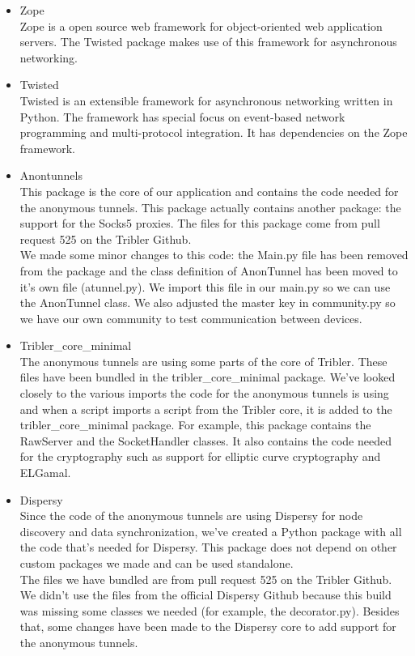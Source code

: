 \documentclass{article}
\begin{document}
\begin{itemize}
		\item Zope\\
		Zope is a open source web framework for object-oriented web application servers. The Twisted package makes use of this framework for asynchronous networking.
	
		\item Twisted\\
		Twisted is an extensible framework for asynchronous networking written in Python. The framework has special focus on event-based network programming and multi-protocol integration. It has dependencies on the Zope framework.
	
		\item Anontunnels\\
		This package is the core of our application and contains the code needed for the anonymous tunnels. This package actually contains another package: the support for the Socks5 proxies. The files for this package come from pull request 525 on the Tribler Github.\\
		
		We made some minor changes to this code: the Main.py file has been removed from the package and the class definition of AnonTunnel has been moved to it’s own file (atunnel.py). We import this file in our main.py so we can use the AnonTunnel class. We also adjusted the master key in community.py so we have our own community to test communication between devices.
		
		\item Tribler\_core\_minimal\\
		The anonymous tunnels are using some parts of the core of Tribler. These files have been bundled in the tribler\_core\_minimal package. We’ve looked closely to the various imports the code for the anonymous tunnels is using and when a script imports a script from the Tribler core, it is added to the tribler\_core\_minimal package. For example, this package contains the RawServer and the SocketHandler classes. It also contains the code needed for the cryptography such as support for elliptic curve cryptography and ELGamal.
		
		\item Dispersy\\
		Since the code of the anonymous tunnels are using Dispersy for node discovery and data synchronization, we’ve created a Python package with all the code that’s needed for Dispersy. This package does not depend on other custom packages we made and can be used standalone.\\
		The files we have bundled are from pull request 525 on the Tribler Github. We didn’t use the files from the official Dispersy Github because this build was missing some classes we needed (for example, the decorator.py). Besides that, some changes have been made to the Dispersy core to add support for the anonymous tunnels.
	
	\end{itemize}
\end{document}
